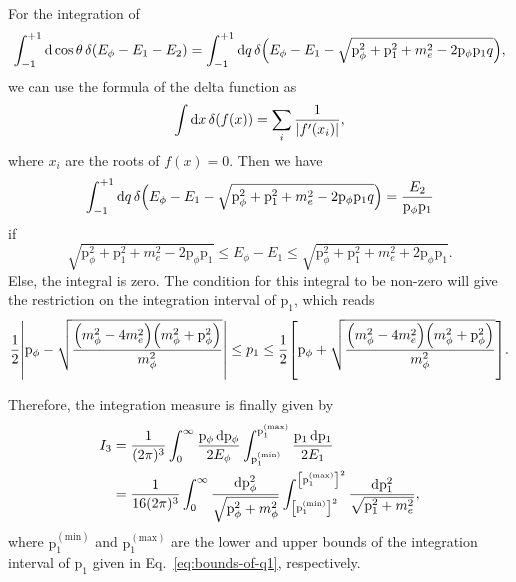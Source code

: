 \documentclass{article}
\begin{document}
            For the integration of
            \begin{equation}
                \int_{-1}^{+1} \dd{\cos \theta} \delta(E_\phi - E_1 - E_2) = \int_{-1}^{+1} \dd{q} \delta\qty(E_\phi - E_1 - \sqrt{\mathrm{p}_\phi^2 + \mathrm{p}_1^2 + m_e^2 - 2 \mathrm{p}_\phi \mathrm{p}_1 q}),
            \end{equation}
            we can use the formula of the delta function as
            \begin{equation}
                \int \dd{x} \delta(f(x)) = \sum_i \frac{1}{\abs{f'(x_i)}},
            \end{equation}
            where $x_i$ are the roots of $f(x) = 0$.
            Then we have
            \begin{equation}
                \int_{-1}^{+1} \dd{q} \delta\qty(E_\phi - E_1 - \sqrt{\mathrm{p}_\phi^2 + \mathrm{p}_1^2 + m_e^2 - 2 \mathrm{p}_\phi \mathrm{p}_1 q}) = \frac{E_2}{\mathrm{p}_\phi \mathrm{p}_1}
            \end{equation}
            if
            \begin{equation}
                \sqrt{\mathrm{p}_\phi^2 + \mathrm{p}_1^2 + m_e^2 - 2 \mathrm{p}_\phi \mathrm{p}_1} \le E_\phi - E_1 \le \sqrt{\mathrm{p}_\phi^2 + \mathrm{p}_1^2 + m_e^2 + 2 \mathrm{p}_\phi \mathrm{p}_1}.
            \end{equation}
            Else, the integral is zero.
            The condition for this integral to be non-zero will give the restriction on the integration interval of $\mathrm{p}_1$, which reads
            \begin{equation}
                \frac{1}{2} \abs{\mathrm{p}_\phi - \sqrt{\frac{\qty(m_\phi^2 - 4 m_e^2) \qty(m_\phi^2 + \mathrm{p}_\phi^2)}{m_\phi^2}}} \le p_1 \le \frac{1}{2} \qty[\mathrm{p}_\phi + \sqrt{\frac{\qty(m_\phi^2 - 4 m_e^2) \qty(m_\phi^2 + \mathrm{p}_\phi^2)}{m_\phi^2}}].
                \label{eq:bounds-of-q1}
            \end{equation}

            Therefore, the integration measure is finally given by
            \begin{equation}
                \begin{aligned}
                    I_3 & = \frac{1}{(2 \pi)^3} \int_0^\infty \frac{\mathrm{p}_\phi \dd{\mathrm{p}_\phi}}{2 E_\phi} \int_{\mathrm{p}_1^\mathrm{(min)}}^{\mathrm{p}_1^\mathrm{(max)}} \frac{\mathrm{p}_1 \dd{\mathrm{p}_1}}{2 E_1} \\
                    & = \frac{1}{16 (2 \pi)^3} \int_0^\infty \frac{\dd{\mathrm{p}_\phi^2}}{\sqrt{\mathrm{p}_\phi^2 + m_\phi^2}} \int_{\qty[\mathrm{p}_1^\mathrm{(min)}]^2}^{\qty[\mathrm{p}_1^\mathrm{(max)}]^2} \frac{\dd{\mathrm{p}_1^2}}{\sqrt{\mathrm{p}_1^2 + m_e^2}},
                \end{aligned}
                \label{eq:integration-measure-1-2}
            \end{equation}
            where $\mathrm{p}_1^\mathrm{(min)}$ and $\mathrm{p}_1^\mathrm{(max)}$ are the lower and upper bounds of the integration interval of $\mathrm{p}_1$ given in Eq.~\eqref{eq:bounds-of-q1}, respectively.
        
\end{document}
